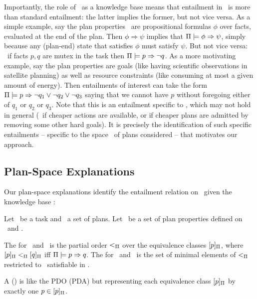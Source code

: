 Importantly, the role of \plans\ as a knowledge base means that
entailment in \plans\ is more than standard entailment: the latter
implies the former, but not vice versa. As a simple example, say the
plan properties \props\ are propositional formulas $\phi$ over facts,
evaluated at the end of the plan. Then $\phi \Rightarrow \psi$ implies
that $\Pi \models \phi \Rightarrow \psi$, simply because any (plan-end)
state that satisfies $\phi$ must satisfy $\psi$. But not vice versa:
\eg\ if facts $p, q$ are mutex in the task then
$\Pi \models p \Rightarrow \neg q$. As a more motivating example, say the
plan properties are goals (like having scientific observations in
satellite planning) as well as resource constraints (like consuming at
most a given amount of energy). Then entailments of interest can take
the form $\Pi \models p \Rightarrow \neg q_1 \vee \neg q_2 \vee \neg q_3$
saying that we cannot have $p$ without foregoing either of $q_1$ or
$q_2$ or $q_3$. Note that this is an entailment specific to \plans,
which may not hold in general (\eg\ if cheaper actions are available,
or if cheaper plans are admitted by removing some other hard
goals). It is precisely the identification of such specific
entailments -- specific to the space \plans\ of plans considered --
that motivates our approach.





\subsection{Plan-Space Explanations}

Our plan-space explanations identify the entailment relation on
\props\ given the knowledge base \plans:

\begin{definition}
Let \task\ be a task and \plans\ a set of plans. Let \props\ be a set
of plan properties defined on \task\ and \plans.

The  for \plans\ and
\props\ is the partial order $<_{\Pi}$ over the equivalence
classes $[p]_{\Pi}$, where $[p]_{\Pi}
<_{\Pi} [q]_{\Pi}$ iff
$\Pi \models p \Rightarrow q$.
%
The  for
\plans\ and \props\ is the set of minimal elements of $<_{\Pi}$
restricted to \prop\ satisfiable in \plans.

A  () is
like the PDO (PDA) but representing each equivalence class
$[p]_{\Pi}$ by exactly one $p \in
[p]_{\Pi}$.
\end{definition}

